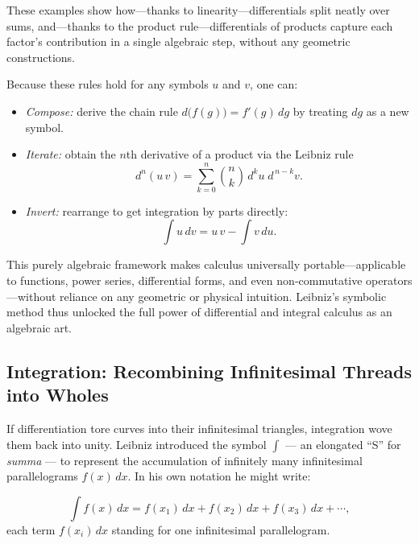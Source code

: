 These examples show how—thanks to linearity—differentials split neatly over sums, and—thanks to the 
product rule—differentials of products capture each factor’s contribution in a single algebraic step, 
without any geometric constructions.  














Because these rules hold for any symbols \(u\) and \(v\), one can:

\begin{itemize}
  \item \emph{Compose:} derive the chain rule \(d\bigl(f(g)\bigr)=f'(g)\,dg\) by treating \(dg\) as a new symbol.
  \item \emph{Iterate:} obtain the \(n\)th derivative of a product via the Leibniz rule 
    \[
      d^n(u\,v)
      = \sum_{k=0}^n \binom{n}{k}\,d^k u \;d^{\,n-k}v.
    \]
  \item \emph{Invert:} rearrange to get integration by parts directly:
    \[
      \int u\,dv = u\,v - \int v\,du.
    \]
\end{itemize}

This purely algebraic framework makes calculus universally portable—applicable to functions, power series, 
differential forms, and even non‐commutative operators—without reliance on any geometric or physical intuition.  
Leibniz’s symbolic method thus unlocked the full power of differential and integral calculus as an algebraic art.  




\subsection{Integration: Recombining Infinitesimal Threads into Wholes}

If differentiation tore curves into their infinitesimal triangles, integration wove them back into unity.  
Leibniz introduced the symbol \(\displaystyle \int\) --- an elongated ``S'' for \emph{summa} --- to represent 
the accumulation of infinitely many infinitesimal parallelograms \(f(x)\,dx\).  In his own notation he might write:

\[
\int f(x)\,dx
=
f(x_{1})\,dx + f(x_{2})\,dx + f(x_{3})\,dx + \cdots,
\]
each term \(f(x_{i})\,dx\) standing for one infinitesimal parallelogram.  

\medskip

